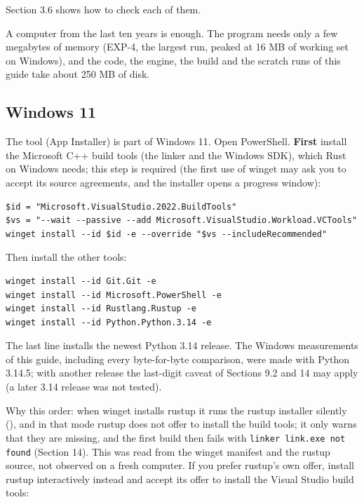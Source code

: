 \documentclass[11pt]{article}
\begin{document}
Section 3.6 shows how to check each of them.

A computer from the last ten years is enough. The program needs only a few megabytes of memory (EXP-4, the largest run, peaked at 16 MB of working set on Windows), and the code, the engine, the build and the scratch runs of this guide take about 250 MB of disk.

\subsection{Windows 11}

The tool \texttt{} (App Installer) is part of Windows 11. Open PowerShell. \textbf{First} install the Microsoft C++ build tools (the linker \texttt{} and the Windows SDK), which Rust on Windows needs; this step is required (the first use of winget may ask you to accept its source agreements, and the installer opens a progress window):

\begin{Verbatim}[fontsize=\small]
$id = "Microsoft.VisualStudio.2022.BuildTools"
$vs = "--wait --passive --add Microsoft.VisualStudio.Workload.VCTools"
winget install --id $id -e --override "$vs --includeRecommended"
\end{Verbatim}

Then install the other tools:

\begin{Verbatim}[fontsize=\small]
winget install --id Git.Git -e
winget install --id Microsoft.PowerShell -e
winget install --id Rustlang.Rustup -e
winget install --id Python.Python.3.14 -e
\end{Verbatim}

The last line installs the newest Python 3.14 release. The Windows measurements of this guide, including every byte-for-byte comparison, were made with Python 3.14.5; with another release the last-digit caveat of Sections 9.2 and 14 may apply (a later 3.14 release was not tested).

Why this order: when winget installs rustup it runs the rustup installer silently (\texttt{}), and in that mode rustup does not offer to install the build tools; it only warns that they are missing, and the first build then fails with \texttt{linker l\allowbreak{}ink.exe \allowbreak{}not foun\allowbreak{}d} (Section 14). This was read from the winget manifest and the rustup source, not observed on a fresh computer. If you prefer rustup's own offer, install rustup interactively instead and accept its offer to install the Visual Studio build tools:
\end{document}
